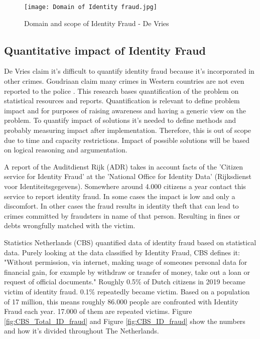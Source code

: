     \begin{figure}
        \graphicspath{ {./images/} }
        \texttt{[image: Domain of Identity fraud.jpg]}\\
        \caption{Domain and scope of Identity Fraud - De Vries \etal \cite{Vries2007IdentiteitsfraudeEA}}
        \label{fig:ID_fraud}
    \end{figure}

\subsection{Quantitative impact of Identity Fraud}\label{QI}
De Vries \etal claim it's difficult to quantify identity fraud because it's incorporated in other crimes\cite{Vries2007IdentiteitsfraudeEA}. Goudriaan \etal claim many crimes in Western countries are not even reported to the police \cite{Gourdriaan_etal}. This research bases quantification of the problem on statistical resources and reports. Quantification is relevant to define problem impact and for purposes of raising awareness and having a generic view on the problem. To quantify impact of solutions it's needed to define methods and probably measuring impact after implementation. Therefore, this is out of scope due to time and capacity restrictions. Impact of possible solutions will be based on logical reasoning and argumentation.

A report of the Auditdienst Rijk (ADR)\cite{ADR} takes in account facts of the 'Citizen service for Identity Fraud' at the 'National Office for Identity Data' (Rijksdienst voor Identiteitsgegevens). Somewhere around 4.000 citizens a year contact this service to report identity fraud. In some cases the impact is low and only a discomfort. In other cases the fraud results in identity theft that can lead to crimes committed by fraudsters in name of that person. Resulting in fines or debts wrongfully matched with the victim.\par 
Statistics Netherlands (CBS) quantified data of identity fraud based on statistical data. Purely looking at the data classified by Identity Fraud, CBS defines it: "Without permission, via internet, making usage of someones personal data for financial gain, for example by withdraw or transfer of money, take out a loan or request of official documents." Roughly 0.5\% of Dutch citizens in 2019 became victim of identity fraud. 0.1\% repeatedly became victim. Based on a population of 17 million, this means roughly 86.000 people are confronted with Identity Fraud each year. 17.000 of them are repeated victims. Figure \ref{fig:CBS_Total_ID_fraud} and Figure \ref{fig:CBS_ID_fraud} show the numbers and how it's divided throughout The Netherlands.

